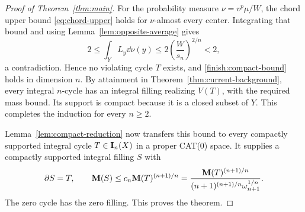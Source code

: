 \begin{proof}[Proof of Theorem~\ref{thm:main}]
For the probability measure \(\nu=v^p\mu/W\), the chord upper bound
\eqref{eq:chord-upper} holds for \(\nu\)-almost every center. Integrating
that bound and using Lemma~\ref{lem:opposite-average} gives
\[
 2\le\int_YL_y\dd\nu(y)
   \le2\left(\frac W{s_n}\right)^{2/n}<2,
\]
a contradiction. Hence no violating cycle \(T\) exists, and
\eqref{finish:compact-bound} holds in dimension \(n\). By attainment
in Theorem~\ref{thm:current-background}, every integral \(n\)-cycle
has an integral filling realizing \(V(T)\), with the required mass
bound. Its support is compact because it is a closed subset of \(Y\).
This completes the induction for every \(n\ge2\).

Lemma~\ref{lem:compact-reduction} now transfers this bound to every
compactly supported integral cycle \(T\in\mathbf I_n(X)\) in a proper
CAT(0) space. It supplies a compactly supported integral filling
\(S\) with
\[
 \partial S=T,\qquad
 \mathbf M(S)\le c_n\mathbf M(T)^{(n+1)/n}
 =\frac{\mathbf M(T)^{(n+1)/n}}
 {(n+1)^{(n+1)/n}\omega_{n+1}^{1/n}}.
\]
The zero cycle has the zero filling. This proves the theorem.
\end{proof}
